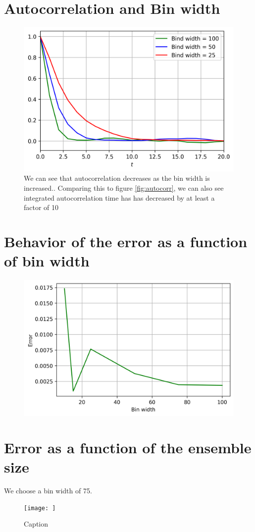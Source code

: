 \documentclass{cernatsnote}
\begin{document}
\section{Autocorrelation and Bin width}
\begin{figure}[H]
    \centering
    \includegraphics[scale = 0.8]{images/bin_v_t.png}
    \caption{We can see that autocorrelation decreases as the bin width is increased.. Comparing this to figure \ref{fig:autocorr}, we can also see integrated autocorrelation time has has decreased by at least a factor of 10}
    \label{fig:}
\end{figure}
\section{Behavior of the error as a function of bin width}
\begin{figure}[H]
    \centering
    \includegraphics[scale = 0.7]{images/error_v_bin.png}
    \label{fig:}
\end{figure}
\section{Error as a function of the ensemble size}
We choose a bin width of 75.
\begin{figure}[H]
    \centering
    \texttt{[image: ]}
    \caption{Caption}
    \label{fig:}
\end{figure}


\end{document}
